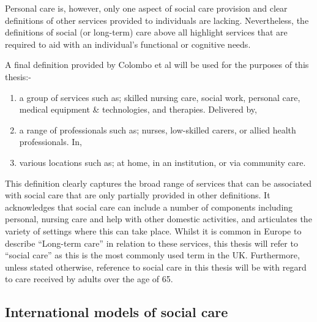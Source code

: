 \documentclass[12pt,]{report}
\begin{document}
Personal care is, however, only one aspect of social care provision and
clear definitions of other services provided to individuals are lacking.
Nevertheless, the definitions of social (or long-term) care above all
highlight services that are required to aid with an individual's
functional or cognitive needs.

A final definition provided by Colombo et al\citeyearpar{RN414} will be
used for the purposes of this thesis:-

\begin{enumerate}[noitemsep, label={\alph*)}]
\item a group of services such as; skilled nursing care, social work, personal care, medical equipment \& technologies, and therapies. Delivered by,   
\item a range of  professionals such as; nurses, low-skilled carers, or allied health professionals. In,  
\item various locations such as; at home, in an institution, or via community care.
\end{enumerate}

This definition clearly captures the broad range of services that can be
associated with social care that are only partially provided in other
definitions. It acknowledges that social care can include a number of
components including personal, nursing care and help with other domestic
activities, and articulates the variety of settings where this can take
place. Whilst it is common in Europe to describe ``Long-term care'' in
relation to these services, this thesis will refer to ``social care'' as
this is the most commonly used term in the UK. Furthermore, unless
stated otherwise, reference to social care in this thesis will be with
regard to care received by adults over the age of 65.

\subsection{International models of social care}\label{subsec:access-sc-models}
\end{document}
